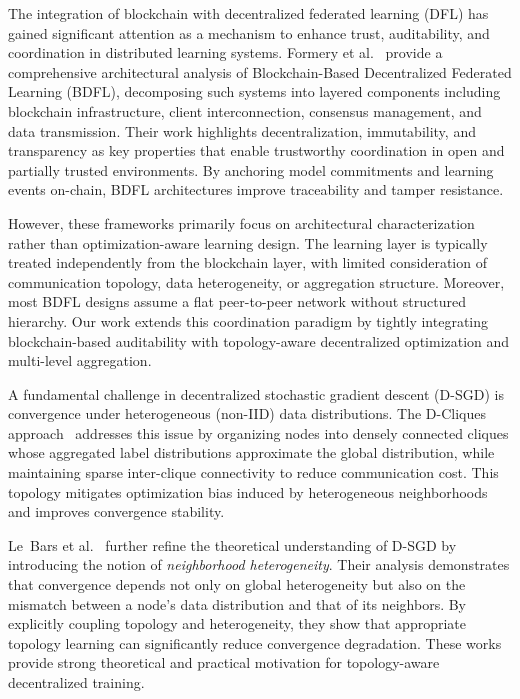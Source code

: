 The integration of blockchain with decentralized federated learning (DFL) has gained significant attention as a mechanism to enhance trust, auditability, and coordination in distributed learning systems. Formery et al.~\cite{BCFramework} provide a comprehensive architectural analysis of Blockchain-Based Decentralized Federated Learning (BDFL), decomposing such systems into layered components including blockchain infrastructure, client interconnection, consensus management, and data transmission. Their work highlights decentralization, immutability, and transparency as key properties that enable trustworthy coordination in open and partially trusted environments. By anchoring model commitments and learning events on-chain, BDFL architectures improve traceability and tamper resistance.

However, these frameworks primarily focus on architectural characterization rather than optimization-aware learning design. The learning layer is typically treated independently from the blockchain layer, with limited consideration of communication topology, data heterogeneity, or aggregation structure. Moreover, most BDFL designs assume a flat peer-to-peer network without structured hierarchy. Our work extends this coordination paradigm by tightly integrating blockchain-based auditability with topology-aware decentralized optimization and multi-level aggregation.

A fundamental challenge in decentralized stochastic gradient descent (D-SGD) is convergence under heterogeneous (non-IID) data distributions. The D-Cliques approach~\cite{Dclique} addresses this issue by organizing nodes into densely connected cliques whose aggregated label distributions approximate the global distribution, while maintaining sparse inter-clique connectivity to reduce communication cost. This topology mitigates optimization bias induced by heterogeneous neighborhoods and improves convergence stability.

Le~Bars et al.~\cite{Refined} further refine the theoretical understanding of D-SGD by introducing the notion of \emph{neighborhood heterogeneity}. Their analysis demonstrates that convergence depends not only on global heterogeneity but also on the mismatch between a node’s data distribution and that of its neighbors. By explicitly coupling topology and heterogeneity, they show that appropriate topology learning can significantly reduce convergence degradation. These works provide strong theoretical and practical motivation for topology-aware decentralized training.

